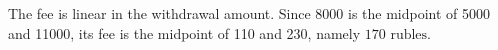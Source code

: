 The fee is linear in the withdrawal amount. Since 8000 is the midpoint of 5000 and 11000, its fee is the midpoint of 110 and 230, namely $\boxed{170\text{ rubles}}$.
